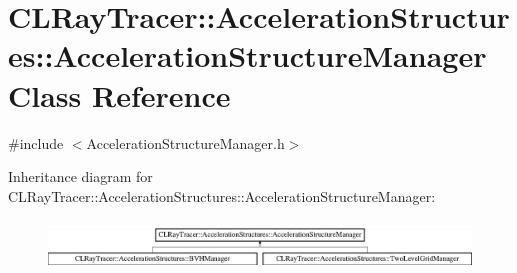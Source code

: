 \hypertarget{class_c_l_ray_tracer_1_1_acceleration_structures_1_1_acceleration_structure_manager}{}\section{C\+L\+Ray\+Tracer\+:\+:Acceleration\+Structures\+:\+:Acceleration\+Structure\+Manager Class Reference}
\label{class_c_l_ray_tracer_1_1_acceleration_structures_1_1_acceleration_structure_manager}


{\ttfamily \#include $<$Acceleration\+Structure\+Manager.\+h$>$}

Inheritance diagram for C\+L\+Ray\+Tracer\+:\+:Acceleration\+Structures\+:\+:Acceleration\+Structure\+Manager\+:\begin{figure}[H]
\begin{center}
\leavevmode
\includegraphics[height=1.355932cm]{class_c_l_ray_tracer_1_1_acceleration_structures_1_1_acceleration_structure_manager}
\end{center}
\end{figure}
